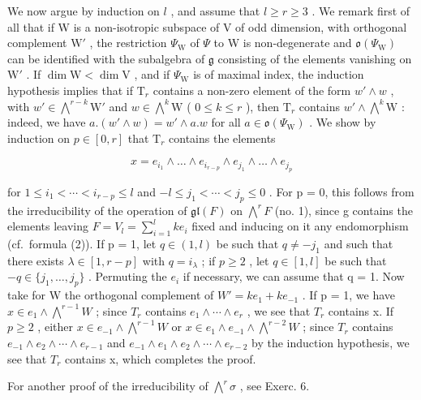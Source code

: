 We now argue by induction on \(l\) , and assume that \(l \geq r \geq 3\) . We remark first of all that if W is a non-isotropic subspace of V of odd dimension, with orthogonal complement \(\mathrm{W}'\) , the restriction \(\Psi_{\mathrm{W}}\) of \(\Psi\) to W is non-degenerate and \(\mathfrak{o}(\Psi_{\mathrm{W}})\) can be identified with the subalgebra of \(\mathfrak{g}\) consisting of the elements vanishing on \(\mathrm{W}'\) . If \(\dim \mathrm{W} < \dim \mathrm{V}\) , and if \(\Psi_{\mathrm{W}}\) is of maximal index, the induction hypothesis implies that if \(\mathrm{T}_r\) contains a non-zero element of the form \(w' \wedge w\) , with \(w' \in \bigwedge^{r - k} \mathrm{W}'\) and \(w \in \bigwedge^k \mathrm{W}\) ( \(0 \leq k \leq r\) ), then \(\mathrm{T}_r\) contains \(w' \wedge \bigwedge^k \mathrm{W}\) : indeed, we have \(a.(w' \wedge w) = w' \wedge a.w\) for all \(a \in \mathfrak{o}(\Psi_{\mathrm{W}})\) . We show by induction on \(p \in [0, r]\) that \(\mathrm{T}_r\) contains the elements

\[
x = e _ {i _ {1}} \wedge \dots \wedge e _ {i _ {r - p}} \wedge e _ {j _ {1}} \wedge \dots \wedge e _ {j _ {p}}
\]

for \(1 \leq i_{1} < \cdots < i_{r-p} \leq l\) and \(-l \leq j_{1} < \cdots < j_{p} \leq 0\) . For p = 0, this follows from the irreducibility of the operation of \(\mathfrak{gl}(F)\) on \(\bigwedge^{r} F\) (no. 1), since g contains the elements leaving \(F = V_{l} = \sum_{i=1}^{l} ke_{i}\) fixed and inducing on it any endomorphism (cf.~formula (2)). If p = 1, let \(q \in (1, l)\) be such that \(q \neq -j_{1}\) and such that there exists \(\lambda \in [1, r - p]\) with \(q = i_{\lambda}\) ; if \(p \geq 2\) , let \(q \in [1, l]\) be such that \(-q \in \{j_{1}, \ldots, j_{p}\}\) . Permuting the \(e_{i}\) if necessary, we can assume that q = 1. Now take for W the orthogonal complement of \(W' = ke_{1} + ke_{-1}\) . If p = 1, we have \(x \in e_{1} \wedge \bigwedge^{r-1} W\) ; since \(T_{r}\) contains \(e_{1} \wedge \cdots \wedge e_{r}\) , we see that \(T_{r}\) contains x. If \(p \geq 2\) , either \(x \in e_{-1} \wedge \bigwedge^{r-1} W\) or \(x \in e_{1} \wedge e_{-1} \wedge \bigwedge^{r-2} W\) ; since \(T_{r}\) contains \(e_{-1} \wedge e_{2} \wedge \cdots \wedge e_{r-1}\) and \(e_{-1} \wedge e_{1} \wedge e_{2} \wedge \cdots \wedge e_{r-2}\) by the induction hypothesis, we see that \(T_{r}\) contains x, which completes the proof.

For another proof of the irreducibility of \(\bigwedge^{r}\sigma\) , see Exerc. 6.

